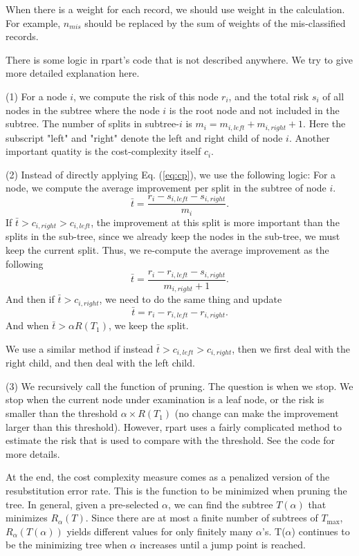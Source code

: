 When there is a weight for each record, we should use weight in the
calculation. For example, $n_{mis}$ should be replaced by the sum of
weights of the mis-classified records.

There is some logic in rpart's code that is not described anywhere. We
try to give more detailed explanation here.

(1) For a node $i$, we compute the risk of this node $r_i$, and the
total risk $s_i$ of all nodes in the subtree where the node $i$ is the
root node and not included in the subtree. The number of splits in
subtree-$i$ is $m_i = m_{i,left} + m_{i,right} + 1$. Here the
subscript "left" and "right" denote the left and right child of node
$i$. Another important quatity is the cost-complexity itself $c_i$.

(2) Instead of directly applying Eq. (\ref{eq:cp}), we use the
following logic: For a node, we compute the average improvement per
split in the subtree of node $i$.
\begin{equation}
    \bar{t} = \frac{r_i - s_{i,left} - s_{i,right}}{m_i}.
\end{equation}
If $\bar{t} > c_{i,right} > c_{i,left}$, the improvement at this split
is more important than the splits in the sub-tree, since we already
keep the nodes in the sub-tree, we must keep the current split. Thus,
we re-compute the average improvement as the following
\begin{equation}
    \bar{t} = \frac{r_i - r_{i,left} - s_{i,right}}{m_{i,right} + 1} .
\end{equation}
And then if $\bar{t} > c_{i,right} $, we need to do the same thing and
update
\begin{equation}
    \bar{t} = r_i - r_{i,left} - r_{i,right} .
\end{equation}
And when $\bar{t} > \alpha R(T_1) $, we keep the split.

We use a similar method if instead $\bar{t} > c_{i,left} >
c_{i,right}$, then we first deal with the right child, and then deal
with the left child.

(3) We recursively call the function of pruning. The question is when
we stop. We stop when the current node under examination is a leaf
node, or the risk is smaller than the threshold $\alpha\times R(T_1)$
(no change can make the improvement larger than this threshold).
However, rpart uses a fairly complicated method to estimate the risk
that is used to compare with the threshold. See the code for more
details.

At the end, the cost complexity measure comes as a penalized version
of the resubstitution error rate. This is the function to be minimized
when pruning the tree. In general, given a pre-selected $\alpha$, we
can find the subtree $T(\alpha)$ that minimizes $R_\alpha(T)$. Since
there are at most a finite number of subtrees of $T_{\text{max}}$,
$R_\alpha(T(\alpha))$ yields different values for only finitely many
$\alpha$'s. T($\alpha$) continues to be the minimizing tree when
$\alpha$ increases until a jump point is reached.

